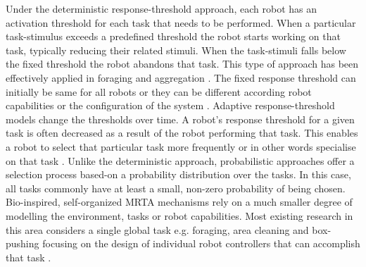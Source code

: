 \documentclass[journal]{IEEEtran}
\begin{document}
Under the deterministic response-threshold approach, each robot has an activation threshold for each task that needs to be performed.
When a particular task-stimulus exceeds a predefined threshold the robot starts working on that task, typically reducing their related stimuli. When the task-stimuli falls below the fixed threshold the robot abandons that task. This type of approach has been effectively applied in foraging \cite{Liu+2007,Krieger+2000} and aggregation \cite{Agassounon+2002}. The fixed response threshold can initially be same for all robots \cite{Jones+2000} or they can be different according robot capabilities or the configuration of the system \cite{Krieger+2000}. Adaptive response-threshold models change the thresholds over time.  A robot's response threshold for a given task is often decreased as a result of the robot performing that task.  This enables a robot to select that particular task more frequently or in other words specialise on that task \cite{Bonabeau+1999,Agassounon+2002}. Unlike the deterministic approach, probabilistic approaches offer a selection process based-on a probability distribution over the tasks.  In this case, all tasks commonly have at least a small, non-zero probability of being chosen.  %
Bio-inspired, self-organized MRTA mechanisms rely on a much smaller degree of modelling the environment, tasks or robot capabilities. Most existing research in this area considers a single global task e.g. foraging, area cleaning and box-pushing focusing on the design of individual robot controllers that can accomplish that task \cite{Gerkey+2003}. 
\end{document}
